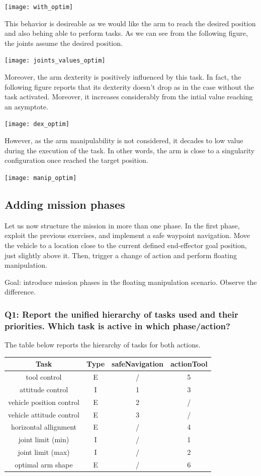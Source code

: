 \documentclass{article}
\begin{document}
\texttt{[image: with\_optim]}
\centering 

This behavior is desireable as we would like the arm to reach the desired position and also behing able to perform tasks. As we can see from the following figure, the joints assume the desired position.

\texttt{[image: joints\_values\_optim]}

Moreover, the arm dexterity is positively influenced by this task. In fact, the following figure reports that its dexterity doesn't drop as in the case without the task activated. Moreover, it increases considerably from the intial value reaching an asymptote.

\texttt{[image: dex\_optim]}

However, as the arm manipulability is not considered, it decades to low value during the execution of the task. In other words, the arm is close to a singularity configuration once reached the target position. 

\texttt{[image: manip\_optim]}

\subsection{Adding mission phases}
Let us now structure the mission in more than one phase. In the first phase, exploit the previous exercises, and implement a safe waypoint navigation. Move the vehicle to a location close to the current defined end-effector goal position, just slightly above it. Then, trigger a change of action and perform floating manipulation.

Goal: introduce mission phases in the floating manipulation scenario. Observe the difference.

\subsubsection{Q1: Report the unified hierarchy of tasks used and their priorities. Which task is active in which phase/action?}
The table below reports the hierarchy of tasks for both actions. 

\begin{tabular}{cccc}
	\toprule
	Task & Type & safeNavigation & actionTool	\\
	\midrule
	tool control                    & E & /  &	5	\\
	\hdashline
	attitude control                & I & 1  &	3	\\
	\hdashline
	vehicle position control        & E & 2  &	/	\\
	\hdashline
	vehicle attitude control        & E & 3  &	/	\\
	\hdashline
	horizontal allignment           & E & /  &	4	\\
	\hdashline
	joint limit (min)               & I & /  &	1	\\
	\hdashline
	joint limit (max)               & I & /  &	2	\\
	\hdashline
	optimal arm shape				& E & /  &	6	\\
	\bottomrule
\end{tabular}
\end{document}
